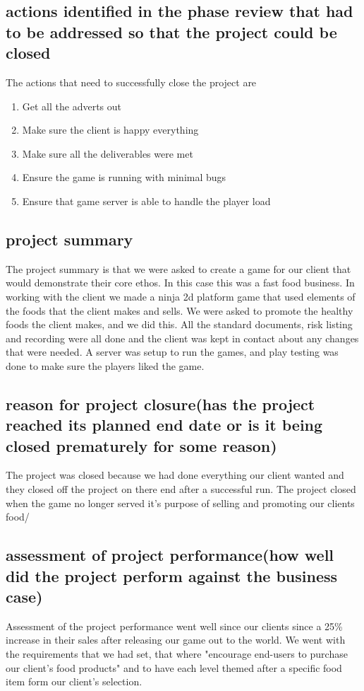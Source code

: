 \documentclass{article}
\begin{document}
\subsection{actions identified in the phase review that had to be addressed so that the project could be closed}

The actions that need to successfully close the project are
\begin{enumerate}
	\item Get all the adverts out 
	\item Make sure the client is happy everything
	\item Make sure all the deliverables were met
	\item Ensure the game is running with minimal bugs
	\item Ensure that game server is able to handle the player load
\end{enumerate}

\subsection{project summary}
The project summary is that we were asked to create a game for our client that would demonstrate their core ethos. In this case this was a fast food business. In working with the client we made a ninja 2d platform game that used elements of the foods that the client makes and sells.
We were asked to promote the healthy foods the client makes, and we did this. 
All the standard documents, risk listing and recording were all done and the client was kept in contact about any changes that were needed.
A server was setup to run the games, and play testing was done to make sure the players liked the game.


\subsection{reason for project closure(has the project reached its planned end date or is it being closed prematurely for some reason)}
The project was closed because we had done everything our client wanted and they closed off the project on there end after a successful run. The project closed when the game no longer served it's purpose of selling and promoting our clients food/


\subsection{assessment of project performance(how well did the project perform against the business case)}
Assessment of the project performance went well since our clients since a 25\% increase in their sales after releasing our game out to the world. We went with the requirements that we had set, that where "encourage end-users to purchase our client's food products" and to have each level themed after a specific food item form our client's selection. 
\end{document}
